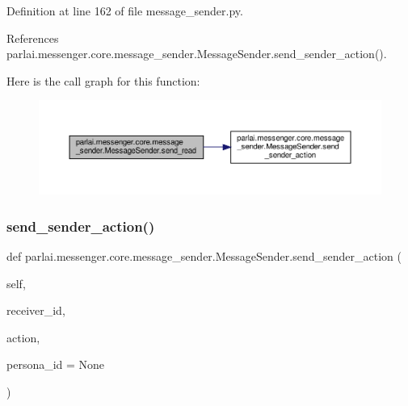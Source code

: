Definition at line 162 of file message\+\_\+sender.\+py.



References parlai.\+messenger.\+core.\+message\+\_\+sender.\+Message\+Sender.\+send\+\_\+sender\+\_\+action().

Here is the call graph for this function\+:
\nopagebreak
\begin{figure}[H]
\begin{center}
\leavevmode
\includegraphics[width=350pt]{classparlai_1_1messenger_1_1core_1_1message__sender_1_1MessageSender_aa278e80e25fca3b45bc2d6328d08d638_cgraph}
\end{center}
\end{figure}
\mbox{\label{classparlai_1_1messenger_1_1core_1_1message__sender_1_1MessageSender_a58c876784f5800234ed341a160bcf1b5}} 
\subsubsection{\texorpdfstring{send\+\_\+sender\+\_\+action()}{send\_sender\_action()}}
{\footnotesize\ttfamily def parlai.\+messenger.\+core.\+message\+\_\+sender.\+Message\+Sender.\+send\+\_\+sender\+\_\+action (\begin{DoxyParamCaption}\item[{}]{self,  }\item[{}]{receiver\+\_\+id,  }\item[{}]{action,  }\item[{}]{persona\+\_\+id = {\ttfamily None} }\end{DoxyParamCaption})}



